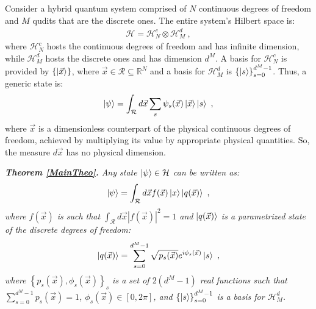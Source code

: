 \documentclass[nofootinbib,pre,twocolumn,showpacs,showkeys,groupaddress,preprintnumbers,floatfix]{revtex4-1}
\newcommand{\1}{\mathbbm{1}}
\begin{document}
Consider a hybrid quantum system comprised of $N$ continuous degrees of freedom
and $M$ qudits that are the discrete ones. The entire system's Hilbert space
is:
\begin{align*}
\mathcal{H} = \mathcal{H}^c_N \otimes \mathcal{H}^d_M
  ~,
\end{align*}
where $\mathcal{H}_N^c$ hosts the continuous degrees of freedom and has
infinite dimension, while $\mathcal{H}^d_M$ hosts the discrete ones and has
dimension $d^M$. A basis for $\mathcal{H}_N^c$ is provided by
$\left\{\ket{\vec{x}}\right\}$, where $\vec{x} \in \mathcal{R} \subseteq
\mathbb{R}^N$ and a basis for $\mathcal{H}_M^d$ is
$\left\{\ket{s}\right\}_{s=0}^{d^M-1}$. Thus, a generic state is:
\begin{align*}
\ket{\psi} = \int_{\mathcal{R}} d\vec{x} \sum_{s} \psi_s(\vec{x})\ket{\vec{x}} \ket{s}
  ~,
\end{align*}
where $\vec{x}$ is a dimensionless counterpart of the physical continuous
degrees of freedom, achieved by multiplying its value by appropriate physical
quantities. So, the measure $d\vec{x}$ has no physical dimension. 


\emph{{\bf Theorem \ref{MainTheo}.}
Any state $\ket{\psi} \in \mathcal{H}$ can be written as:
\begin{align*}
\ket{\psi} = \int_{\mathcal{R}}d\vec{x} f(\vec{x}) \ket{x}\ket{q(\vec{x})}
  ~,
\end{align*}
where $f(\vec{x})$ is such that $\int_{\mathcal{R}}d\vec{x} |f(\vec{x})|^2 = 1$
and $\ket{q(\vec{x})}$ is a parametrized state of the discrete degrees of
freedom:
\begin{align*}
\ket{q(\vec{x})}
  = \sum_{s=0}^{d^M-1} \sqrt{p_s(\vec{x})} e^{i\phi_s(\vec{x})} \ket{s}
  ~,
\end{align*}
where $\left\{ p_s(\vec{x}),\phi_s(\vec{x})\right\}_s$ is a set of $2(d^M-1)$
real functions such that $\sum_{s=0}^{d^M-1} p_s(\vec{x}) = 1$,
$\phi_s(\vec{x}) \in [0,2\pi]$, and $\left\{\ket{s}\right\}_{s=0}^{d^M-1}$ is a
basis for $\mathcal{H}_M^d$.
}
\end{document}
